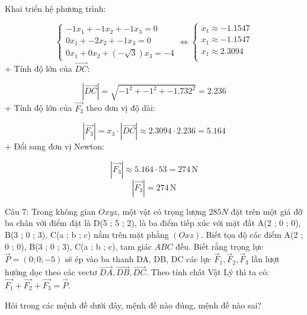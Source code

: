 \documentclass[a4paper,12pt]{article}
\begin{document}
Khai triển hệ phương trình:


\[
\begin{cases}
-1x_1 + -1x_2 + -1x_3 = 0 \\
0x_1 + -2x_2 + -1x_3 = 0 \\
0x_1 + 0x_2 + \left(- \sqrt{3}\right)x_3 = -4
\end{cases}
\Leftrightarrow
\begin{cases}
x_1 \approx -1.1547 \\
x_1 \approx -1.1547 \\
x_1 \approx 2.3094 \\
\end{cases}
\]
+ Tính độ lớn của \(\overrightarrow{DC}\):


\[ |\overrightarrow{DC}| = \sqrt{-1^2 + -1^2 + -1.732^2} = 2.236 \]
+ Tính độ lớn của \(\overrightarrow{F_3}\) theo đơn vị độ dài:


\[ |\overrightarrow{F_3}| = x_3 \cdot |\overrightarrow{DC}| \approx 2.3094 \cdot 2.236 = 5.164 \]
+ Đổi sang đơn vị Newton:


\[ |\overrightarrow{F_3}| \approx 5.164 \cdot 53 = 274\,\mathrm{N} \]
\[|\overrightarrow{F_3}| = 274\,\mathrm{N}\]



Câu 7: Trong không gian \(Oxyz\), một vật có trọng lượng \(285N\) đặt trên một giá đỡ ba chân với điểm đặt là D(5 ; 5 ; 2), là ba điểm tiếp xúc với mặt đất A(2 ; 0 ; 0), B(3 ; 0 ; 3), C(a ; b ; c) nằm trên mặt phẳng \((O x z )\). Biết tọa độ các điểm A(2 ; 0 ; 0), B(3 ; 0 ; 3), C(a ; b ; c), tam giác \(ABC\) đều. Biết rằng trọng lực \(\overrightarrow{P}=(0 ; 0 ; -5)\) sẽ ép vào ba thanh DA, DB, DC các lực \(\overrightarrow{F}_1, \overrightarrow{F}_2, \overrightarrow{F}_3\) lần lượt hướng dọc theo các vectơ \(\overrightarrow{DA}, \overrightarrow{DB}, \overrightarrow{DC}\). Theo tính chất Vật Lý thì ta có: \(\overrightarrow{F_1}+\overrightarrow{F_2}+\overrightarrow{F_3}=\overrightarrow{P}\).

Hỏi trong các mệnh đề dưới đây, mệnh đề nào đúng, mệnh đề nào sai?
\end{document}
